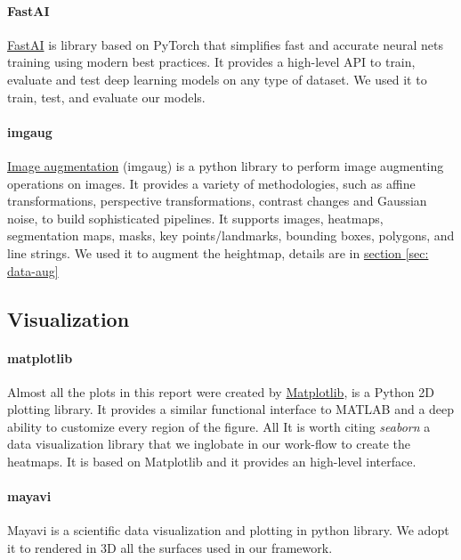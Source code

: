 \documentclass[../document.tex]{subfiles}
\begin{document}
\paragraph{FastAI}\href{https://course.fast.ai/}{FastAI} is library based on PyTorch that simplifies fast and accurate neural nets training using modern best practices. It provides a high-level API to train, evaluate and test deep learning models on any type of dataset. We used it to train, test, and evaluate our models.
\paragraph{imgaug}\href{https://imgaug.readthedocs.io/en/latest/}{Image augmentation} (imgaug) is a python library to perform image augmenting operations on images. It provides a variety of methodologies, such as affine transformations, perspective transformations, contrast changes and Gaussian noise, to build sophisticated pipelines. It supports images,  heatmaps, segmentation maps, masks, key points/landmarks, bounding boxes, polygons, and line strings. We used it to augment the heightmap, details are in \hyperref[sec: data-aug]{section \ref{sec: data-aug}}
\subsection{Visualization}
\paragraph{matplotlib}Almost all the plots in this report were created by \href{https://matplotlib.org/}{Matplotlib}, is a Python 2D plotting library. It provides a similar functional interface to MATLAB and a deep ability to customize every region of the figure. All 
It is worth citing \emph{seaborn} a data visualization library that we inglobate in our work-flow to create the heatmaps. It is based on Matplotlib and it provides an high-level interface.
\paragraph{mayavi}Mayavi is a scientific data visualization and plotting in python library. We adopt it to rendered in 3D all the surfaces used in our framework.
\end{document}
